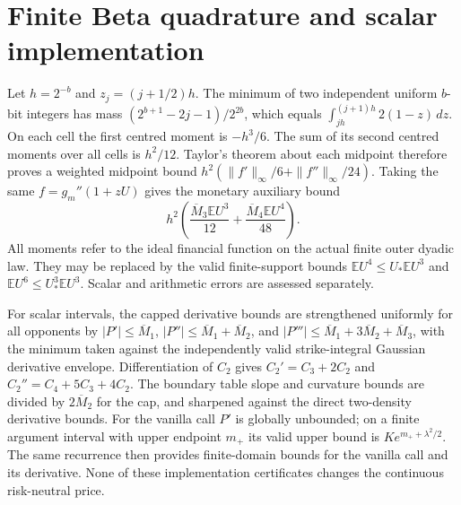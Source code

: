 \section{Finite Beta quadrature and scalar implementation}
Let $h=2^{-b}$ and $z_j=(j+1/2)h$. The minimum of two independent uniform $b$-bit integers has mass $(2^{b+1}-2j-1)/2^{2b}$, which equals $\int_{jh}^{(j+1)h}2(1-z)\,dz$. On each cell the first centred moment is $-h^3/6$. The sum of its second centred moments over all cells is $h^2/12$. Taylor's theorem about each midpoint therefore proves a weighted midpoint bound $h^2(\|f'\|_\infty/6+\|f''\|_\infty/24)$. Taking the same $f=g_m''(1+zU)$ gives the monetary auxiliary bound
\[
 h^2\left(\frac{\overline M_3\mathbb E U^3}{12}+\frac{\overline M_4\mathbb E U^4}{48}\right).
\]
All moments refer to the ideal financial function on the actual finite outer dyadic law. They may be replaced by the valid finite-support bounds $\mathbb E U^4\leq U_*\mathbb E U^3$ and $\mathbb E U^6\leq U_*^3\mathbb E U^3$. Scalar and arithmetic errors are assessed separately.

For scalar intervals, the capped derivative bounds are strengthened uniformly for all opponents by $|P'|\leq\overline M_1$, $|P''|\leq\overline M_1+\overline M_2$, and $|P'''|\leq\overline M_1+3\overline M_2+\overline M_3$, with the minimum taken against the independently valid strike-integral Gaussian derivative envelope. Differentiation of $C_2$ gives $C_2'=C_3+2C_2$ and $C_2''=C_4+5C_3+4C_2$. The boundary table slope and curvature bounds are divided by $2\overline M_2$ for the cap, and sharpened against the direct two-density derivative bounds. For the vanilla call $P'$ is globally unbounded; on a finite argument interval with upper endpoint $m_+$ its valid upper bound is $K e^{m_++\lambda^2/2}$. The same recurrence then provides finite-domain bounds for the vanilla call and its derivative. None of these implementation certificates changes the continuous risk-neutral price.
